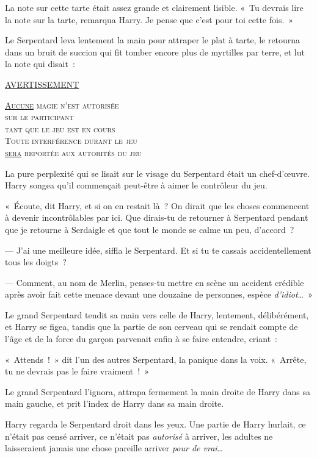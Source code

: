 La note sur cette tarte était assez grande et clairement lisible.
«~Tu devrais lire la note sur la tarte, remarqua Harry. Je pense que c'est pour toi cette fois.~»

Le Serpentard leva lentement la main pour attraper le plat à tarte, le retourna dans un bruit de succion qui fit tomber encore plus de myrtilles par terre, et lut la note qui disait~:

\begin{theGameResults}
\centering
\textsc{\underline{AVERTISSEMENT}}

\textsc{
\underline{Aucune} magie n'est autorisée\\ sur le participant\\
tant que le jeu est en cours\\
Toute interférence durant le jeu\\
\underline{sera} reportée aux autorités du jeu\\}
\end{theGameResults}

La pure perplexité qui se lisait sur le visage du Serpentard était un chef-d'œuvre.
Harry songea qu'il commençait peut-être à aimer le contrôleur du jeu.

«~Écoute, dit Harry, et si on en restait là~?
On dirait que les choses commencent à devenir incontrôlables par ici.
Que dirais-tu de retourner à Serpentard pendant que je retourne à Serdaigle et que tout le monde se calme un peu, d'accord~?

--- J'ai une meilleure idée, siffla le Serpentard. Et si tu te cassais accidentellement tous les doigts~?

--- Comment, au nom de Merlin, penses-tu mettre en scène un accident crédible après avoir fait cette menace devant une douzaine de personnes, espèce \emph{d'idiot}…~»

Le grand Serpentard tendit sa main vers celle de Harry, lentement, délibérément, et Harry se figea, tandis que la partie de son cerveau qui se rendait compte de l'âge et de la force du garçon parvenait enfin à se faire entendre, criant~: 

«~Attends~!~» dit l'un des autres Serpentard, la panique dans la voix.
«~Arrête, tu ne devrais pas le faire vraiment~!~»

Le grand Serpentard l'ignora, attrapa fermement la main droite de Harry dans sa main gauche, et prit l'index de Harry dans sa main droite.

Harry regarda le Serpentard droit dans les yeux.
Une partie de Harry hurlait, ce n'était pas censé arriver, ce n'était pas \emph{autorisé} à arriver, les adultes ne laisseraient jamais une chose pareille arriver \emph{pour de vrai}…

